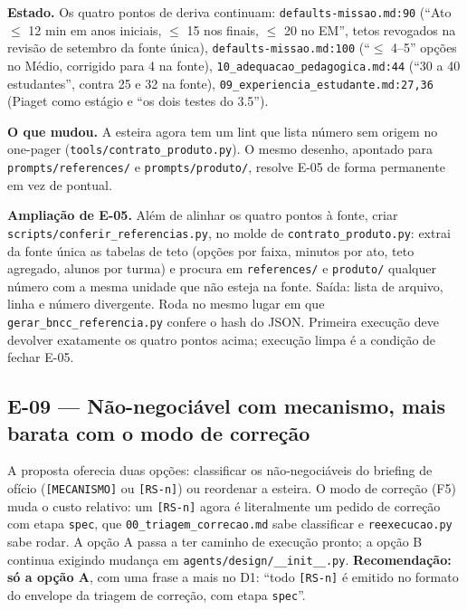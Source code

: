 \documentclass[11pt,a4paper]{article}
\begin{document}
\textbf{Estado.} Os quatro pontos de deriva continuam: \texttt{defaults-missao.md:90} (``Ato $\le$ 12
min em anos iniciais, $\le$ 15 nos finais, $\le$ 20 no EM'', tetos revogados na revisão de setembro da
fonte única), \texttt{defaults-missao.md:100} (``$\le$ 4--5'' opções no Médio, corrigido para 4 na
fonte), \texttt{10\_adequacao\_pedagogica.md:44} (``30 a 40 estudantes'', contra 25 e 32 na fonte),
\texttt{09\_experiencia\_estudante.md:27,36} (Piaget como estágio e ``os dois testes do 3.5'').

\textbf{O que mudou.} A esteira agora tem um lint que lista número sem origem no one-pager
(\texttt{tools/contrato\_produto.py}). O mesmo desenho, apontado para \texttt{prompts/references/} e
\texttt{prompts/produto/}, resolve E-05 de forma permanente em vez de pontual.

\begin{depoisbox}\small
\textbf{Ampliação de E-05.} Além de alinhar os quatro pontos à fonte, criar
\texttt{scripts/conferir\_referencias.py}, no molde de \texttt{contrato\_produto.py}: extrai da fonte
única as tabelas de teto (opções por faixa, minutos por ato, teto agregado, alunos por turma) e
procura em \texttt{references/} e \texttt{produto/} qualquer número com a mesma unidade que não
esteja na fonte. Saída: lista de arquivo, linha e número divergente. Roda no mesmo lugar em que
\texttt{gerar\_bncc\_referencia.py} confere o hash do JSON. Primeira execução deve devolver exatamente
os quatro pontos acima; execução limpa é a condição de fechar E-05.
\end{depoisbox}

\subsection{E-09 --- Não-negociável com mecanismo, mais barata com o modo de correção}
\label{sec:e09}

A proposta oferecia duas opções: classificar os não-negociáveis do briefing de ofício
(\texttt{[MECANISMO]} ou \texttt{[RS-n]}) ou reordenar a esteira. O modo de correção (F5) muda o
custo relativo: um \texttt{[RS-n]} agora é literalmente um pedido de correção com etapa
\texttt{spec}, que \texttt{00\_triagem\_correcao.md} sabe classificar e \texttt{reexecucao.py} sabe
rodar. A opção A passa a ter caminho de execução pronto; a opção B continua exigindo mudança em
\texttt{agents/design/\_\_init\_\_.py}. \textbf{Recomendação: só a opção A}, com uma frase a mais no D1:
``todo \texttt{[RS-n]} é emitido no formato do envelope da triagem de correção, com etapa
\texttt{spec}''.
\end{document}
